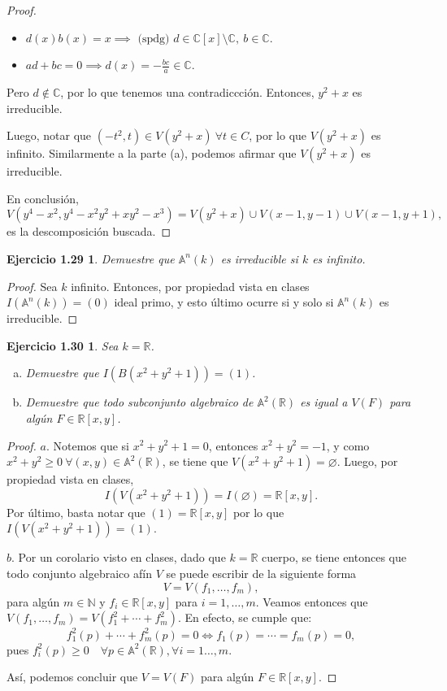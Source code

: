 \documentclass{amsart}
\theoremstyle{plain}
\newtheorem*{ejercicio2}{Ejercicio 1.29}
\newtheorem*{ejercicio3}{Ejercicio 1.30}
\newcommand{\N}{\mathbb{N}}
\newcommand{\R}{\mathbb{R}}
\newcommand{\C}{\mathbb{C}}
\begin{document}
\begin{proof}
\begin{itemize}
			\item $d(x) b(x) = x \implies \text{ (spdg) } d \in \C[x] \setminus \C,\ b \in \C$.

			\item $ad + bc = 0 \implies d(x) = -\frac{bc}{a} \in \C$.
		\end{itemize}
		Pero $d \not \in \C$, por lo que tenemos una contradiccción. Entonces, $y^{2} + x$ es irreducible. \par
		Luego, notar que $(-t^{2},t) \in V(y^{2} + x) \ \forall t \in C$, por lo que $V(y^{2} + x)$ es infinito. Similarmente a la parte (a), podemos afirmar que $V(y^{2} + x)$ es irreducible. \par
		En conclusión,
		\[ V(y^{4} - x^{2}, y^{4} - x^{2}y^{2} + xy^{2} - x^{3}) = V(y^{2} + x) \cup V(x - 1, y - 1) \cup V(x - 1, y + 1), \]
		es la descomposición buscada.
	\end{proof}

	\begin{ejercicio2}
		Demuestre que $\mathbb{A}^{n}(k)$ es irreducible si $k$ es infinito.
	\end{ejercicio2}
	\begin{proof}
		Sea $k$ infinito. Entonces, por propiedad vista en clases $I(\mathbb{A}^{n}(k)) = (0)$ ideal primo, y esto último ocurre si y solo si $\mathbb{A}^{n}(k)$ es irreducible.
	\end{proof}

	\begin{ejercicio3}
		Sea $k = \R$.
		\begin{enumerate}[a)]
			\item Demuestre que $I(B(x^{2} + y^{2} +1)) = (1)$.

			\item Demuestre que todo subconjunto algebraico de $\mathbb{A}^{2}(\R)$ es igual a $V(F)$ para algún $F \in \R[x,y]$.
		\end{enumerate}
	\end{ejercicio3}
	\begin{proof}
		$\boxed{a.}$ Notemos que si $x^{2} + y^{2} + 1 = 0$, entonces $x^{2} + y^{2} = -1$, y como $x^{2} + y^{2} \geq 0 \ \forall (x,y) \in \mathbb{A}^{2}(\R)$, se tiene que $V(x^{2} + y^{2} + 1) = \varnothing$. Luego, por propiedad vista en clases,
		\[ I(V(x^{2} + y^{2} + 1)) = I(\varnothing) = \R[x,y]. \]
		Por último, basta notar que $(1) = \R[x,y]$ por lo que $I(V(x^{2} + y^{2} + 1)) = (1)$. \par
		$\boxed{b.}$ Por un corolario visto en clases, dado que $k = \R$ cuerpo, se tiene entonces que todo conjunto algebraico afín $V$ se puede escribir de la siguiente forma
		\[ V = V(f_{1},\dots,f_{m}), \]
		para algún $m \in \N$ y $f_{i} \in \R[x,y]$ para $i = 1,\dots,m$. Veamos entonces que $V(f_{1},\dots,f_{m}) = V(f_{1}^{2} + \cdots + f_{m}^{2})$. En efecto, se cumple que:
		\[ f_{1}^{2}(p) + \cdots + f_{m}^{2}(p) = 0 \iff f_{1}(p) = \cdots = f_{m}(p) = 0, \]
		pues $f_{i}^{2}(p) \geq 0 \quad \forall p \in \mathbb{A}^{2}(\R), \forall i = 1 \dots, m$. \par
		Así, podemos concluir que $V = V(F)$ para algún $F \in \R[x,y]$.
	\end{proof}
\end{document}

